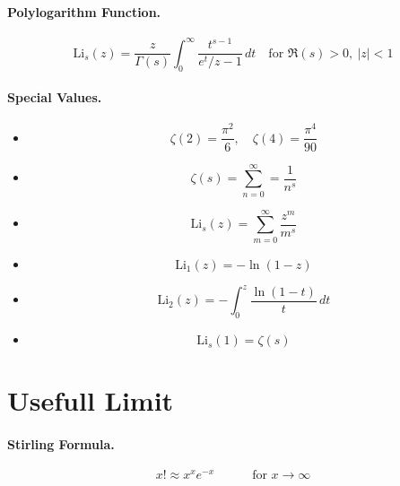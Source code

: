 \documentclass{article}
\begin{document}
\paragraph{Polylogarithm Function.}
\[
\text{Li}_s(z) = \frac{z}{\Gamma(s)} \int_0^\infty \frac{t^{s-1}}{e^t/z - 1} \, dt \quad \text{for } \Re(s) > 0, \ |z| < 1
\]
\paragraph{Special Values.}
\begin{itemize}
    \item 
    \[
    \zeta(2) = \frac{\pi^2}{6}, \quad \zeta(4) = \frac{\pi^4}{90}
    \]
    \item 
    \[
    \zeta(s) = \sum^\infty_{n = 0} = \frac{1}{n^s}
    \]
    \item 
    \[
    \text{Li}_s(z) = \sum^\infty_{m = 0} \frac{z^m}{m^s}
    \]
    \item 
    \[
    \text{Li}_1(z) = -\ln(1-z)
    \]
    \item 
    \[
    \text{Li}_2(z) = -\int_0^z \frac{\ln(1-t)}{t} \, dt
    \]
    \item 
    \[
    \text{Li}_s(1) = \zeta(s)
    \]
\end{itemize}

\section{Usefull Limit}
\paragraph{Stirling Formula.}
\[
x! \approx x^{x} e^{-x} \quad\quad\quad \text{for } x \longrightarrow \infty 
\]
\end{document}
